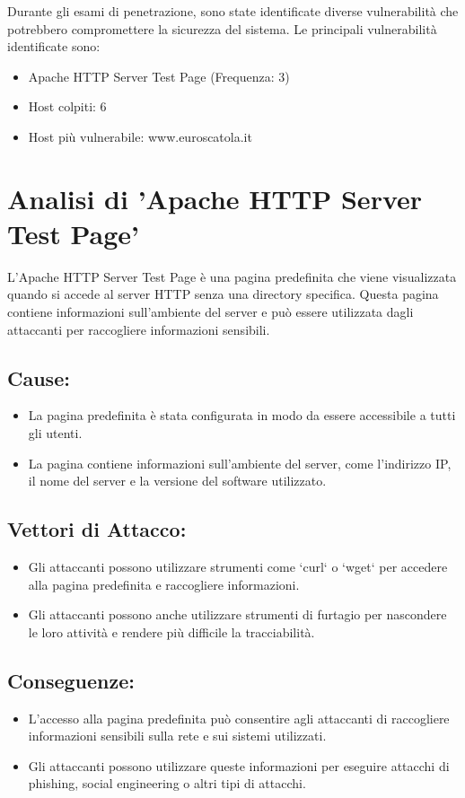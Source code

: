 Durante gli esami di penetrazione, sono state identificate diverse vulnerabilità che potrebbero compromettere la sicurezza del sistema. Le principali vulnerabilità identificate sono:
\begin{itemize}
\item Apache HTTP Server Test Page (Frequenza: 3)
\item Host colpiti: 6
\item Host più vulnerabile: www.euroscatola.it
\end{itemize}
\section{Analisi di 'Apache HTTP Server Test Page'}

L'Apache HTTP Server Test Page è una pagina predefinita che viene visualizzata quando si accede al server HTTP senza una directory specifica. Questa pagina contiene informazioni sull'ambiente del server e può essere utilizzata dagli attaccanti per raccogliere informazioni sensibili.

\subsection{Cause:}
\begin{itemize}
\item La pagina predefinita è stata configurata in modo da essere accessibile a tutti gli utenti.
\item La pagina contiene informazioni sull'ambiente del server, come l'indirizzo IP, il nome del server e la versione del software utilizzato.
\end{itemize}
\subsection{Vettori di Attacco:}
\begin{itemize}
\item Gli attaccanti possono utilizzare strumenti come `curl` o `wget` per accedere alla pagina predefinita e raccogliere informazioni.
\item Gli attaccanti possono anche utilizzare strumenti di furtagio per nascondere le loro attività e rendere più difficile la tracciabilità.
\end{itemize}
\subsection{Conseguenze:}
\begin{itemize}
\item L'accesso alla pagina predefinita può consentire agli attaccanti di raccogliere informazioni sensibili sulla rete e sui sistemi utilizzati.
\item Gli attaccanti possono utilizzare queste informazioni per eseguire attacchi di phishing, social engineering o altri tipi di attacchi.
\end{itemize}

